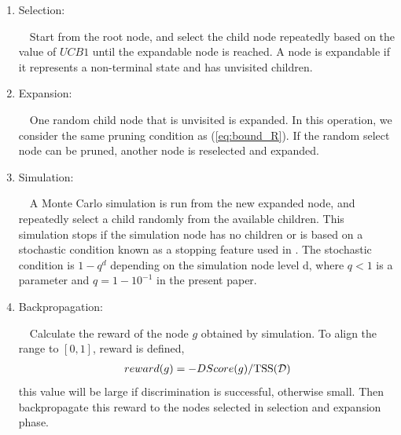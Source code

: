\begin{enumerate}
	\item{Selection}:

	~~Start from the root node, and select the child node repeatedly 
	based on the value of $UCB1$ until the expandable node is reached.
	A node is expandable if it represents a non-terminal state and has unvisited children.

	\item{Expansion}:

	~~One random child node that is unvisited is expanded.
	In this operation, we consider the same pruning condition as (\ref{eq:bound_R}). 
	If the random select node can be pruned, another node is reselected and expanded.

	\item{Simulation}:
	
	~~A Monte Carlo simulation is run from the new expanded node,
	and repeatedly select a child randomly from the available children.
	This simulation stops if the simulation node has no children or 
	is based on a stochastic condition known as a stopping feature used in \cite{Romaric:2010}.
	The stochastic condition is $1 - q^{d}$ depending on the simulation node level d,
	where $q < 1$ is a parameter and $q = 1 - 10^{-1}$ in the present paper.
	
	\item{Backpropagation}:

	~~Calculate the reward of the node $g$ obtained by simulation.
	To align the range to $[0, 1]$, reward is defined, 
	\begin{eqnarray}
		reward(g) = -DScore(g) / \mathrm{TSS}(\mathcal{D})
	\end{eqnarray}
	this value will be large if discrimination is successful, otherwise small.
	Then backpropagate this reward to the nodes selected in selection and expansion phase.
\end{enumerate}

